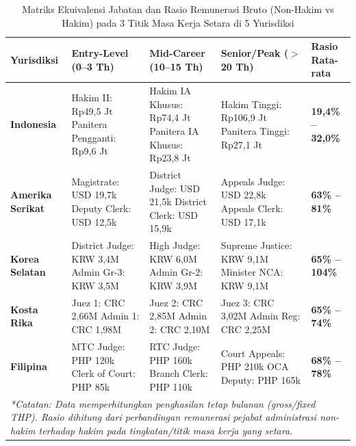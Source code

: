 \documentclass[12pt, a4paper]{article}
\begin{document}
\begin{table}[H]
\centering
\fontsize{8.5}{10.5}\selectfont
\caption{Matriks Ekuivalensi Jabatan dan Rasio Remunerasi Bruto (Non-Hakim vs Hakim) pada 3 Titik Masa Kerja Setara di 5 Yurisdiksi}
\label{tab:ekuivalensi-3titik}
\renewcommand{\arraystretch}{1.3}
\begin{tabular}{p{2.2cm} p{3.8cm} p{3.8cm} p{3.8cm} p{1.6cm}}
\hline
\textbf{Yurisdiksi} & \textbf{Entry-Level (0--3 Th)} & \textbf{Mid-Career (10--15 Th)} & \textbf{Senior/Peak ($>$ 20 Th)} & \textbf{Rasio Rata-rata} \\
\hline
\raggedright\textbf{Indonesia} & Hakim II: Rp49,5 Jt \newline Panitera Pengganti: Rp9,6 Jt & Hakim IA Khusus: Rp74,4 Jt \newline Panitera IA Khusus: Rp23,8 Jt & Hakim Tinggi: Rp106,9 Jt \newline Panitera Tinggi: Rp27,1 Jt & \textbf{19,4\% -- 32,0\%} \\
\raggedright\textbf{Amerika Serikat} & Magistrate: USD 19,7k \newline Deputy Clerk: USD 12,5k & District Judge: USD 21,5k \newline District Clerk: USD 15,9k & Appeals Judge: USD 22,8k \newline Appeals Clerk: USD 17,1k & \textbf{63\% -- 81\%} \\
\raggedright\textbf{Korea Selatan} & District Judge: KRW 3,4M \newline Admin Gr-3: KRW 3,5M & High Judge: KRW 6,0M \newline Admin Gr-2: KRW 3,9M & Supreme Justice: KRW 9,1M \newline Minister NCA: KRW 9,1M & \textbf{65\% -- 104\%} \\
\raggedright\textbf{Kosta Rika} & Juez 1: CRC 2,66M \newline Admin 1: CRC 1,98M & Juez 2: CRC 2,85M \newline Admin 2: CRC 2,10M & Juez 3: CRC 3,02M \newline Admin Reg: CRC 2,25M & \textbf{65\% -- 74\%} \\
\raggedright\textbf{Filipina} & MTC Judge: PHP 120k \newline Clerk of Court: PHP 85k & RTC Judge: PHP 160k \newline Branch Clerk: PHP 110k & Court Appeals: PHP 210k \newline OCA Deputy: PHP 165k & \textbf{68\% -- 78\%} \\
\hline
\multicolumn{5}{p{15.5cm}}{\textit{*Catatan: Data memperhitungkan penghasilan tetap bulanan (gross/fixed THP). Rasio dihitung dari perbandingan remunerasi pejabat administrasi non-hakim terhadap hakim pada tingkatan/titik masa kerja yang setara.}} \\
\hline
\end{tabular}
\end{table}
\end{document}
